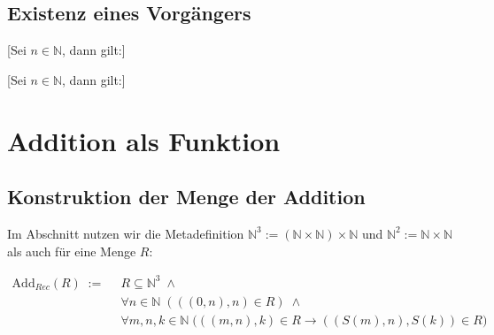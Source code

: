 \documentclass[main.tex]{subfiles}
\begin{document}
\section{Existenz eines Vorgängers}
[Sei \(n\in\mathbb{N}\), dann gilt:]
\begin{tabproof}


\end{tabproof}


[Sei \(n\in\mathbb{N}\), dann gilt:]
\begin{tabproof}

\end{tabproof}





\chapter{Addition als Funktion}
\section{Konstruktion der Menge der Addition}

Im Abschnitt nutzen wir die Metadefinition \(\mathbb{N}^3:=(\mathbb{N}\times\mathbb{N})\times\mathbb{N}\) und \(\mathbb{N}^2:=\mathbb{N}\times\mathbb{N}\) als auch für eine Menge \(R\):


\(\begin{aligned}
\mathrm{Add}_{Rec}(R)\;:=\;&\ R \subseteq \mathbb{N}^3 \;\land\\
&\ \forall n\in\mathbb{N}\;(((0,n),n)\in R) \;\land\\
&\ \forall m,n,k\in\mathbb{N}\;\bigl(((m,n),k)\in R \rightarrow ((S(m),n),S(k))\in R\bigr)
\end{aligned}
\)
\end{document}

